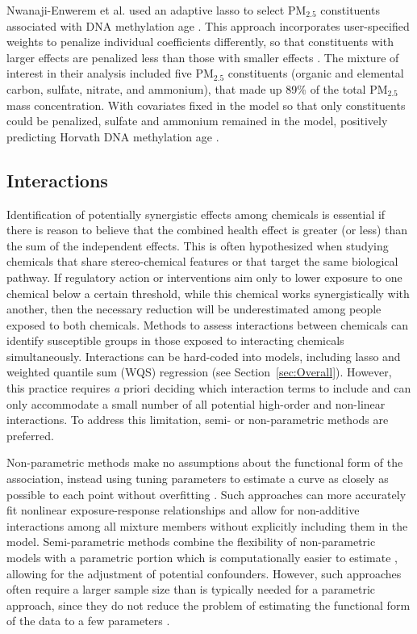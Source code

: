 Nwanaji-Enwerem et al. used an adaptive lasso to select PM$_{2.5}$ constituents associated with DNA methylation age \cite{nwanaji2017associations}. This approach incorporates user-specified weights to penalize individual coefficients differently, so that constituents with larger effects are penalized less than those with smaller effects \cite{zou2006adaptive}. The mixture of interest in their analysis included five PM$_{2.5}$ constituents (organic and elemental carbon, sulfate, nitrate, and ammonium), that made up 89\% of the total PM$_{2.5}$ mass concentration. With covariates fixed in the model so that only constituents could be penalized, sulfate and ammonium remained in the model, positively predicting Horvath DNA methylation age \cite{nwanaji2017associations}.

\subsection{Interactions}\label{sec:Interact}

Identification of potentially synergistic effects among chemicals is essential if there is reason to believe that the combined health effect is greater (or less) than the sum of the independent effects. This is often hypothesized when studying chemicals that share stereo-chemical features or that target the same biological pathway. If regulatory action or interventions aim only to lower exposure to one chemical below a certain threshold, while this chemical works synergistically with another, then the necessary reduction will be underestimated among people exposed to both chemicals. Methods to assess interactions between chemicals can identify susceptible groups in those exposed to interacting chemicals simultaneously. Interactions can be hard-coded into models, including lasso and weighted quantile sum (WQS) regression (see Section~\ref{sec:Overall}). However, this practice requires {\textit a priori} deciding which interaction terms to include and can only accommodate a small number of all potential high-order and non-linear interactions. To address this limitation, semi- or non-parametric methods are preferred.

Non-parametric methods make no assumptions about the functional form of the association, instead using tuning parameters to estimate a curve as closely as possible to each point without overfitting \cite{ISLR}. Such approaches can more accurately fit nonlinear exposure-response relationships and allow for non-additive interactions among all mixture members without explicitly including them in the model. Semi-parametric methods combine the flexibility of non-parametric models with a parametric portion which is computationally easier to estimate \cite{friedman2001elements}, allowing for the adjustment of potential confounders. However, such approaches often require a larger sample size than is typically needed for a parametric approach, since they do not reduce the problem of estimating the functional form of the data to a few parameters \cite{ISLR}.

